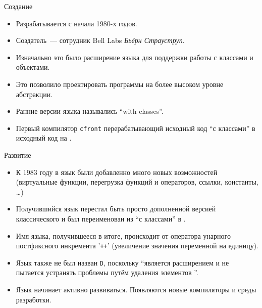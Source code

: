 \documentclass[aspectration=1610,t]{beamer}
\begin{document}
\begin{frame}{Создание \langcpp}
    \begin{itemize}
        \item Разрабатывается с начала 1980-х годов.
            
        \item Создатель~--- сотрудник Bell Labs {\em Бьёрн Страуструп}.
            
        \item Изначально это было расширение языка \langc для поддержки работы с 
            классами и объектами.
            
        \item Это позволило проектировать программы на более высоком уровне
            абстракции.
            
        \item Ранние версии языка назывались ``\langc with classes''.

        \item Первый компилятор \texttt{cfront} перерабатывающий исходный код
            ``\langc с классами'' в исходный код на \langc. 
    \end{itemize}
\end{frame}

\begin{frame}{Развитие \langcpp}
    \begin{itemize}
        \item  К 1983 году в язык были добавленно много новых возможностей
            (виртуальные функции, перегрузка функций и операторов, ссылки, 
            константы, \dots)

        \item Получившийся язык перестал быть просто дополненной
            версией классического \langc и был переименован из ``\langc с классами'' в \langcpp. 
        
        \item Имя языка, получившееся в итоге, происходит от оператора 
            унарного постфиксного инкремента \langc{} '{\tt ++}' (увеличение значения переменной на единицу). 
            
        \item Язык также не был назван \texttt{D}, поскольку ``является расширением \langc
            и не пытается устранять проблемы путём удаления элементов \langc''.
        
        \item Язык начинает активно развиваться. Появляются новые компиляторы
             и среды разработки.
    \end{itemize}
\end{frame}
\end{document}
